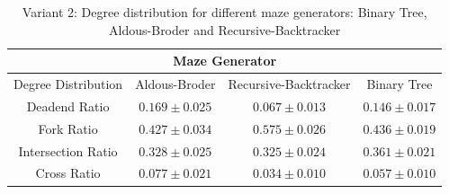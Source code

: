      \begin{table}[!h]
        \begin{center} 
            \caption{Variant 2: Degree distribution for different maze generators: Binary Tree, Aldous-Broder and Recursive-Backtracker} 
        \begin{tabular}{ c c c c} 
        \multicolumn{4}{c}{Maze Generator} \\
        \hline
    Degree Distribution&Aldous-Broder&Recursive-Backtracker&Binary Tree\\
        \hline
    Deadend Ratio&$0.169\pm 0.025$&$0.067\pm 0.013$&$0.146\pm 0.017$\\    
        \hline
    Fork Ratio&$0.427\pm 0.034$&$0.575\pm 0.026$&$0.436\pm 0.019$\\ 
        \hline
    Intersection Ratio&$0.328\pm 0.025$&$0.325\pm 0.024$&$0.361\pm 0.021$\\   
        \hline
    Cross Ratio&$0.077\pm 0.021$&$0.034\pm 0.010$&$0.057\pm 0.010$\\   
        \hline   
         \end{tabular} 
        \end{center}
         \end{table}
         \newpage
